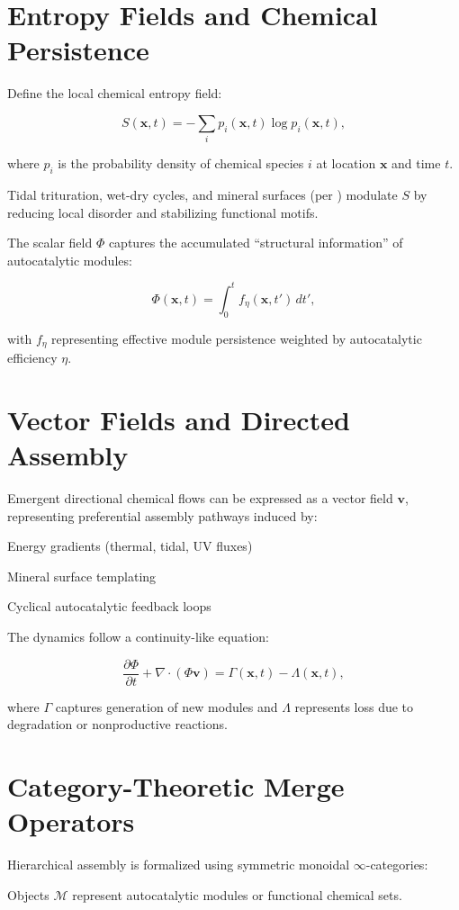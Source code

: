 \documentclass[openany]{book}
\begin{document}
\section{Entropy Fields and Chemical Persistence}
Define the local chemical entropy field:

\[S(\mathbf{x}, t) = - \sum_i p_i(\mathbf{x}, t) \log p_i(\mathbf{x}, t),\]

where $p_i$ is the probability density of chemical species $i$ at location $\mathbf{x}$ and time $t$.

Tidal trituration, wet-dry cycles, and mineral surfaces (per \citealt{hazen2005}) modulate $S$ by reducing local disorder and stabilizing functional motifs.

The scalar field $\Phi$ captures the accumulated “structural information” of autocatalytic modules:

\[\Phi(\mathbf{x}, t) = \int_0^t f_\eta(\mathbf{x}, t') \, dt',\]

with $f_\eta$ representing effective module persistence weighted by autocatalytic efficiency $\eta$.

\section{Vector Fields and Directed Assembly}
Emergent directional chemical flows can be expressed as a vector field $\mathbf{v}$, representing preferential assembly pathways induced by:

Energy gradients (thermal, tidal, UV fluxes)

Mineral surface templating \citep{hazen2005}

Cyclical autocatalytic feedback loops

The dynamics follow a continuity-like equation:

\[\frac{\partial \Phi}{\partial t} + \nabla \cdot (\Phi \mathbf{v}) = \Gamma(\mathbf{x}, t) - \Lambda(\mathbf{x}, t),\]

where $\Gamma$ captures generation of new modules and $\Lambda$ represents loss due to degradation or nonproductive reactions.

\section{Category-Theoretic Merge Operators}
Hierarchical assembly is formalized using symmetric monoidal $\infty$-categories:

Objects $\mathcal{M}$ represent autocatalytic modules or functional chemical sets.
\end{document}
